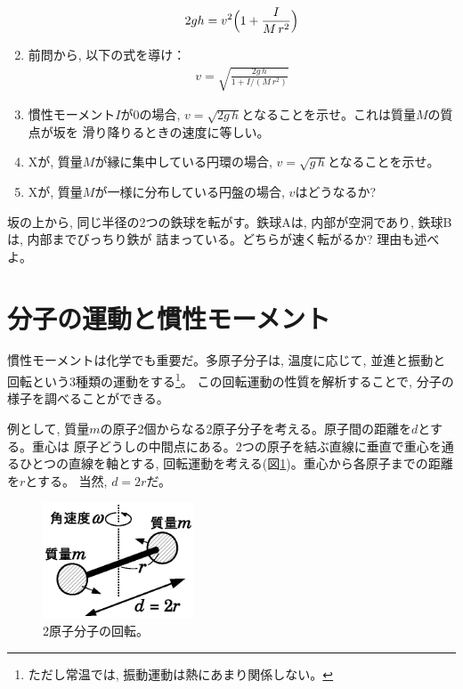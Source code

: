\begin{q}
\begin{enumerate}
\begin{eqnarray}
2gh=v^2\Bigl(1+\frac{I}{M\,r^2}\Bigr)\label{eq:mominert_wheel_slope3}
\end{eqnarray}
\item 前問から, 以下の式を導け：
\begin{eqnarray}
v=\sqrt{\frac{2g\,h}{1+I/(M\,r^2)}}\label{eq:mominert_wheel_slope_v}
\end{eqnarray}
\item 慣性モーメント$I$が0の場合, $v=\sqrt{2g\,h}$となることを示せ。これは質量$M$の質点が坂を
滑り降りるときの速度に等しい。
\item Xが, 質量$M$が縁に集中している円環の場合, $v=\sqrt{g\,h}$となることを示せ。
\item Xが, 質量$M$が一様に分布している円盤の場合, $v$はどうなるか?
\end{enumerate}
\end{q}
\mv

%
\begin{q}\label{q:mominert_ball_slope}
坂の上から, 同じ半径の2つの鉄球を転がす。鉄球Aは, 内部が空洞であり, 鉄球Bは, 内部までびっちり鉄が
詰まっている。どちらが速く転がるか? 理由も述べよ。
\end{q}
\hv


\section{分子の運動と慣性モーメント}

慣性モーメントは化学でも重要だ。多原子分子は, 温度に応じて, 並進と振動と
回転という3種類の運動をする\footnote{ただし常温では, 振動運動は熱にあまり関係しない。}。
この回転運動の性質を解析することで, 分子の様子を調べることができる。

例として, 質量$m$の原子2個からなる2原子分子を考える。原子間の距離を$d$とする。重心は
原子どうしの中間点にある。2つの原子を結ぶ直線に垂直で重心を通るひとつの直線を軸とする, 
回転運動を考える(図\ref{fig:angular_mom_H2})。重心から各原子までの距離を$r$とする。
当然, $d=2r$だ。
\begin{figure}[h]
    \centering
    \includegraphics[width=4.5cm]{angular_mom_2balls.eps}
    \caption{2原子分子の回転。}\label{fig:angular_mom_H2}
\end{figure}

